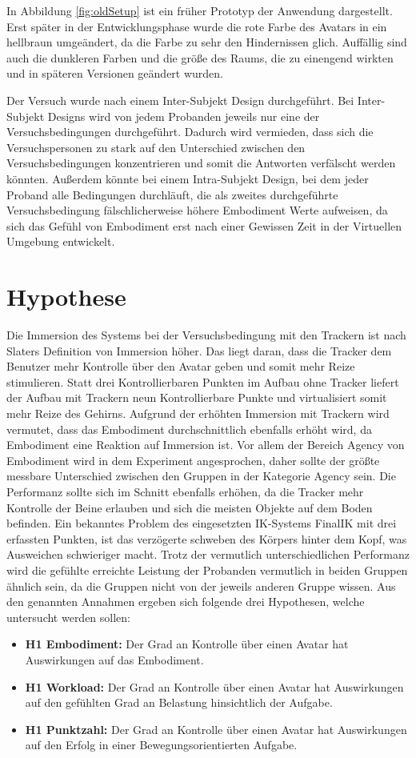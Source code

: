 In Abbildung \ref{fig:oldSetup} ist ein früher Prototyp der Anwendung dargestellt. Erst später in der Entwicklungsphase wurde die rote Farbe des Avatars in ein hellbraun umgeändert, da die Farbe zu sehr den Hindernissen glich. Auffällig sind auch die dunkleren Farben und die größe des Raums, die zu einengend wirkten und in späteren Versionen geändert wurden.

Der Versuch wurde nach einem Inter-Subjekt Design durchgeführt. Bei Inter-Subjekt Designs wird von jedem Probanden jeweils nur eine der Versuchsbedingungen durchgeführt. Dadurch wird vermieden, dass sich die Versuchspersonen zu stark auf den Unterschied zwischen den Versuchsbedingungen konzentrieren und somit die Antworten verfälscht werden könnten. Außerdem könnte bei einem Intra-Subjekt Design, bei dem jeder Proband alle Bedingungen durchläuft, die als zweites durchgeführte Versuchsbedingung fälschlicherweise höhere Embodiment Werte aufweisen, da sich das Gefühl von Embodiment erst nach einer Gewissen Zeit in der Virtuellen Umgebung entwickelt.


\section{Hypothese}
Die Immersion des Systems bei der Versuchsbedingung mit den Trackern ist nach Slaters Definition von Immersion \cite{Slater2003}\cite{Slater1999} höher. Das liegt daran, dass die Tracker dem Benutzer mehr Kontrolle über den Avatar geben und somit mehr Reize stimulieren. Statt drei Kontrollierbaren Punkten im Aufbau ohne Tracker liefert der Aufbau mit Trackern neun Kontrollierbare Punkte und virtualisiert somit mehr Reize des Gehirns.
Aufgrund der erhöhten Immersion mit Trackern wird vermutet, dass das Embodiment durchschnittlich ebenfalls erhöht wird, da Embodiment eine Reaktion auf Immersion ist. Vor allem der Bereich Agency von Embodiment wird in dem Experiment angesprochen, daher sollte der größte messbare Unterschied zwischen den Gruppen in der Kategorie Agency sein.
Die Performanz sollte sich im Schnitt ebenfalls erhöhen, da die Tracker mehr Kontrolle der Beine erlauben und sich die meisten Objekte auf dem Boden befinden. Ein bekanntes Problem des eingesetzten IK-Systems FinalIK mit drei erfassten Punkten, ist das verzögerte schweben des Körpers hinter dem Kopf, was Ausweichen schwieriger macht. Trotz der vermutlich unterschiedlichen Performanz wird die gefühlte erreichte Leistung der Probanden vermutlich in beiden Gruppen ähnlich sein, da die Gruppen nicht von der jeweils anderen Gruppe wissen.
Aus den genannten Annahmen ergeben sich folgende drei Hypothesen, welche untersucht werden sollen:
\begin{itemize} 
\item \textbf{H1 Embodiment:} Der Grad an Kontrolle über einen Avatar hat Auswirkungen auf das Embodiment.
\item \textbf{H1 Workload:} Der Grad an Kontrolle über einen Avatar hat Auswirkungen auf den gefühlten Grad an Belastung hinsichtlich der Aufgabe.
\item \textbf{H1 Punktzahl:} Der Grad an Kontrolle über einen Avatar hat Auswirkungen auf den Erfolg in einer Bewegungsorientierten Aufgabe.
\end{itemize}


